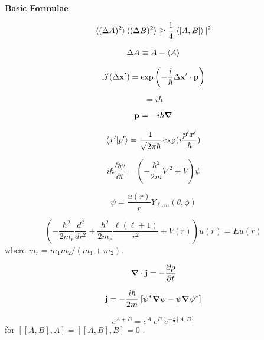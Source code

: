 {\bf Basic Formulae}

\begin{equation} %
\braket{(\Delta A)^2} \braket{(\Delta B)^2}
  \ge \frac{1}{4} |\!\braket{[A,B]}|^2
\end{equation}

\begin{equation}
\Delta A \equiv A - \braket{A}
\end{equation}

\begin{equation}
\mathcal{J} (\Delta \boldsymbol{\mathbf{x}}') = \exp \left (-\frac{i}{\hbar} \Delta \boldsymbol{\mathbf{x}}' \cdot \boldsymbol{\mathbf{p}} \right)
\end{equation}

\begin{equation}
[\,x,p\,] = i\hbar
\end{equation}

\begin{equation}
\boldsymbol{\mathbf{p}} = -i \hbar \boldsymbol{\mathbf{\nabla}}
\end{equation}

\begin{equation}
\braket{x'|p'} = \frac{1}{\sqrt{2\pi\hbar}} \exp (i\frac{p'x'}{\hbar})
\end{equation}

\begin{equation}
i\hbar \frac{\partial \psi}{\partial t} = (-\frac{\hbar^2}{2m} \nabla^2 + V) \psi
\end{equation}

\begin{equation}
\psi = \frac{u(r)}{r} Y_{\ell,m}(\theta,\phi)
\end{equation}

\begin{equation}
\left(
  -\frac{\hbar^2}{2m_r} \frac{d^2}{d r^2}
  + \frac{\hbar^2}{2m_r} \frac{\ell (\ell+1)}{r^2}
  + V(r)
\right) u(r) = E u(r)
\end{equation}
where $m_r = m_1 m_2 / (m_1 + m_2)$.

\begin{equation}
\boldsymbol{\mathbf{\nabla}} \cdot \boldsymbol{\mathbf{j}} = - \frac{\partial \rho}{\partial t}
\end{equation}

\begin{equation}
\boldsymbol{\mathbf{j}} = - \frac{i \hbar}{2m} \: [\psi^* \boldsymbol{\mathbf{\nabla}} \psi - \psi \boldsymbol{\mathbf{\nabla}} \psi^*]
\end{equation}

\begin{equation}
e^{A+B}=e^A \: e^B \: e^{-\frac{1}{2}[A,B]}
\end{equation}
{\footnotesize for \( [[A,B],A]=[[A,B],B]=0 \) .}
